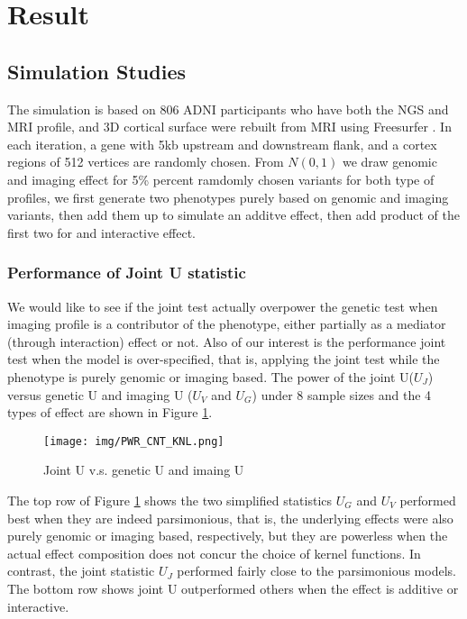\section{Result}
\subsection{Simulation Studies}
The simulation is based on 806 ADNI participants who have both the NGS and MRI profile, and 3D cortical surface were rebuilt from MRI using Freesurfer \FS. In each iteration, a gene with 5kb upstream and downstream flank, and a cortex regions of 512 vertices are randomly chosen. From $N(0,1)$ we draw genomic and imaging effect for 5\% percent ramdomly chosen variants for both type of profiles, we first generate two phenotypes purely based on genomic and imaging variants, then add them up to simulate an additve effect, then add product of the first two for and interactive effect.

\subsubsection{Performance of Joint U statistic}
We would like to see if the joint test actually overpower the genetic test when imaging profile is a contributor of the phenotype, either partially as a mediator (through interaction) effect or not. Also of our interest is the performance joint test when the model is over-specified, that is, applying the joint test while the phenotype is purely genomic or imaging based. The power of the joint U($U_J$) versus genetic U and imaging U ($U_V$ and $U_G$) under 8 sample sizes and the 4 types of effect are shown in Figure \ref{fig:PWR_CNT_KNL}.
\begin{figure}[!htbp]
\centering
\texttt{[image: img/PWR\_CNT\_KNL.png]}
\caption{Joint U v.s. genetic U and imaing U}
\label{fig:PWR_CNT_KNL}
\end{figure}
The top row of Figure \ref{fig:PWR_CNT_KNL} shows the two simplified statistics $U_G$ and $U_V$ performed best when they are indeed parsimonious, that is, the underlying effects were also purely genomic or imaging based, respectively, but they are powerless when the actual effect composition does not concur the choice of kernel functions. In contrast, the joint statistic $U_J$ performed fairly close to the parsimonious models. The bottom row shows joint U outperformed others when the effect is additive or interactive.

